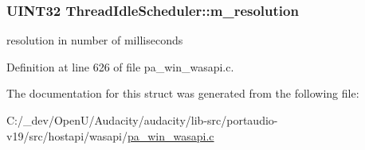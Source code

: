\subsubsection[{\texorpdfstring{m\+\_\+resolution}{m_resolution}}]{\setlength{\rightskip}{0pt plus 5cm}U\+I\+N\+T32 Thread\+Idle\+Scheduler\+::m\+\_\+resolution}\hypertarget{struct_thread_idle_scheduler_ad82606350adc83e95aea1527bd8926c3}{}\label{struct_thread_idle_scheduler_ad82606350adc83e95aea1527bd8926c3}


resolution in number of milliseconds 



Definition at line 626 of file pa\+\_\+win\+\_\+wasapi.\+c.



The documentation for this struct was generated from the following file\+:\begin{DoxyCompactItemize}
\item 
C\+:/\+\_\+dev/\+Open\+U/\+Audacity/audacity/lib-\/src/portaudio-\/v19/src/hostapi/wasapi/\hyperlink{pa__win__wasapi_8c}{pa\+\_\+win\+\_\+wasapi.\+c}\end{DoxyCompactItemize}

